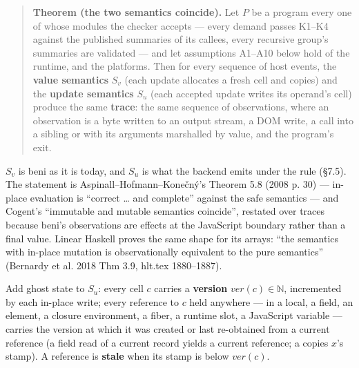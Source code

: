 

\begin{quote}
\textbf{Theorem (the two semantics coincide).} Let $P$ be a program every one of whose modules the checker accepts — every demand passes K1–K4 against the published summaries of its callees, every recursive group's summaries are validated — and let assumptions A1–A10 below hold of the runtime,  and the platforms. Then for every sequence of host events, the \textbf{value semantics} $S_{v}$ (each update allocates a fresh cell and copies) and the \textbf{update semantics} $S_{u}$ (each accepted update writes its operand's cell) produce the same \textbf{trace}: the same sequence of observations, where an observation is a byte written to an output stream, a DOM write, a call into a  sibling or  with its arguments marshalled by value, and the program's exit.
\end{quote}

$S_{v}$ is beni as it is today, and $S_{u}$ is what the backend emits under the rule (§7.5). The statement is Aspinall–Hofmann–Konečný's Theorem 5.8 (2008 p. 30) — in-place evaluation is “correct … and complete” against the safe semantics — and Cogent's “immutable and mutable semantics coincide”, restated over traces because beni's observations are effects at the JavaScript boundary rather than a final value. Linear Haskell proves the same shape for its arrays: “the semantics with in-place mutation is observationally equivalent to the pure semantics” (Bernardy et al. 2018 Thm 3.9, hlt.tex 1880–1887).


Add ghost state to $S_{u}$: every cell $c$ carries a \textbf{version} $\mathit{ver}(c)\in \mathbb{N}$, incremented by each in-place write; every reference to $c$ held anywhere — in a local, a field, an element, a closure environment, a fiber, a runtime slot, a JavaScript variable — carries the version at which it was created or last re-obtained from a current reference (a field read of a current record yields a current reference; a  copies $x$'s stamp). A reference is \textbf{stale} when its stamp is below $\mathit{ver}(c)$.

